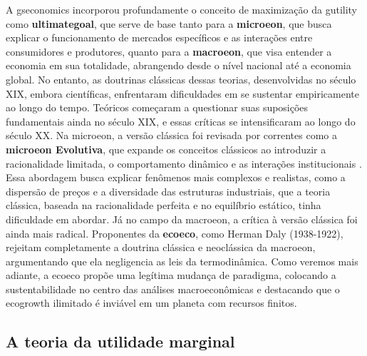 \documentclass[./main.tex]{subfiles}
\begin{document}
\par A \gls{gseconomics} incorporou profundamente o conceito de maximização da \gls{gutility} como \textbf{\gls{ultimategoal}}, que serve de base tanto para a \textbf{\gls{microeon}}, que busca explicar o funcionamento de mercados específicos e as interações entre consumidores e produtores, quanto para a \textbf{\gls{macroeon}}, que visa entender a economia em sua totalidade, abrangendo desde o nível nacional até a economia global. No entanto, as doutrinas clássicas dessas teorias, desenvolvidas no século XIX, embora científicas, enfrentaram dificuldades em se sustentar empiricamente ao longo do tempo. Teóricos começaram a questionar suas suposições fundamentais ainda no século XIX, e essas críticas se intensificaram ao longo do século XX. Na \gls{microeon}, a versão clássica foi revisada por correntes como a \textbf{\gls{microeon} Evolutiva}, que expande os conceitos clássicos ao introduzir a racionalidade limitada, o comportamento dinâmico e as interações institucionais \cite{Nelson1985a, Bourgine2006a}. Essa abordagem busca explicar fenômenos mais complexos e realistas, como a dispersão de preços e a diversidade das estruturas industriais, que a \gls{teoria} clássica, baseada na racionalidade perfeita e no equilíbrio estático, tinha dificuldade em abordar. Já no campo da \gls{macroeon}, a crítica à versão clássica foi ainda mais radical. Proponentes da \textbf{\gls{ecoeco}}, como Herman Daly (1938-1922), rejeitam completamente a doutrina clássica e neoclássica da \gls{macroeon}, argumentando que ela negligencia as leis da termodinâmica. Como veremos mais adiante, a \gls{ecoeco} propõe uma legítima mudança de \gls{paradigma}, colocando a sustentabilidade no centro das análises macroeconômicas e destacando que o \gls{ecogrowth} ilimitado é inviável em um planeta com recursos finitos.

\subsection{A teoria da utilidade marginal} \label{subsec:marginutil}
\end{document}
